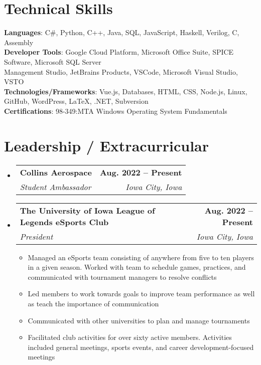 \documentclass[letterpaper,11pt]{article}
\makeatletter
\newcommand{\resumeItem}[1]{
  \item\small{
    {#1 \vspace{-2pt}}
  }
}
\newcommand{\resumeSubheading}[4]{
  \vspace{-2pt}\item
    \begin{tabular*}{1.0\textwidth}[t]{l@{\extracolsep{\fill}}r}
      \textbf{#1} & \textbf{\small #2} \\
      \textit{\small#3} & \textit{\small #4} \\
    \end{tabular*}\vspace{-7pt}
}
\newcommand{\resumeSubHeadingListStart}{\begin{itemize}[leftmargin=0.0in, label={}]}
\newcommand{\resumeSubHeadingListEnd}{\end{itemize}}
\newcommand{\resumeItemListStart}{\begin{itemize}}
\newcommand{\resumeItemListEnd}{\end{itemize}\vspace{-5pt}}
\makeatother
\begin{document}
\section{Technical Skills}
 \begin{itemize}[leftmargin=0.15in, label={}]
    \small{\item{
     \textbf{Languages}{: C\#, Python, C++, Java, SQL, JavaScript, Haskell, Verilog, C, Assembly} \\
     \textbf{Developer Tools}{: Google Cloud Platform, Microsoft Office Suite, SPICE Software, Microsoft SQL Server \\Management Studio, JetBrains Products, VSCode, Microsoft Visual Studio, VSTO} \\
     \textbf{Technologies/Frameworks}{: Vue.js, Databases, HTML, CSS, Node.js, Linux, GitHub, WordPress, LaTeX, .NET, Subversion} \\
     \textbf{Certifications}{: 98-349:MTA Windows Operating System Fundamentals} \\
    }}
 \end{itemize}
 \vspace{-8pt}


\section{Leadership / Extracurricular}
    \resumeSubHeadingListStart
        \resumeSubheading{Collins Aerospace}{Aug. 2022 -- Present}{Student Ambassador}{Iowa City, Iowa} 
        \vspace{2pt}
        \resumeSubheading{The University of Iowa League of Legends eSports Club}{Aug. 2022 -- Present}{President}{Iowa City, Iowa}
        \vspace{2pt}
                \resumeItemListStart
                    \resumeItem{Managed an eSports team consisting of anywhere from five to ten players in a given season. Worked with team to schedule games, practices, and communicated with tournament managers to resolve conflicts}
                    \resumeItem{Led members to work towards goals to improve team performance as well as teach the importance of communication}
                    \resumeItem{Communicated with other universities to plan and manage tournaments}
                    \resumeItem{Facilitated club activities for over sixty active members. Activities included general meetings, sports events, and career development-focused meetings}          \resumeSubHeadingListEnd       
                \resumeItemListEnd
\vspace{.3 in}
\end{document}
